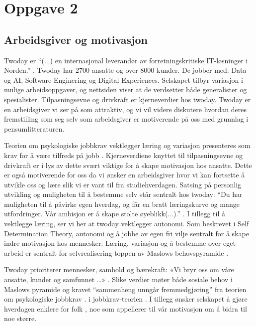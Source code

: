\section{Oppgave 2}
\subsection{Arbeidsgiver og motivasjon}
Twoday er \enquote{(...) en internasjonal leverandør av forretningskritiske IT-løsninger i Norden.}
\parencite{Twoday.no}. Twoday har 2700 ansatte og over 8000 kunder. De jobber med: Data og AI, Software Enginering og Digital Experiences. Selskapet tilbyr variasjon i mulige arbeidsoppgaver, og nettsiden viser at de
verdsetter både generalister og spesialister. Tilpasningsevne og drivkraft er kjerneverdier hos twoday. Twoday er
en arbeidsgiver vi ser på som attraktiv, og vi vil videre diskutere hvordan deres fremstilling som seg selv som 
arbeidsgiver er motiverende på oss med grunnlag i pensumlitteraturen. 

Teorien om psykologiske jobbkrav vektlegger læring og variasjon presenteres som krav for å være tilfreds på jobb \parencite[][s.120]{Teknologiledelse}. 
Kjerneverdiene knyttet til tilpasningsevne og drivkraft er i lys av dette svært viktige for å skape motivasjon hos ansatte. Dette er også motiverende for 
oss da vi ønsker en arbeidsgiver hvor vi kan fortsette å utvikle oss og lære slik vi er vant til fra studiehverdagen.
Satsing på personlig utvikling og muligheten til å bestemme selv står sentralt hos twoday: \enquote{Du har muligheten
til å påvirke egen hverdag, og får en bratt læringskurve og mange utfordringer. Vår ambisjon er å
skape stolte øyeblikk(...).} \parencite["Graduateprogrammet"]{Twoday.no}. I tillegg til å vektlegge læring, ser
vi her at twoday vektlegger autonomi. Som beskrevet i Self Determination Theory\parencite[][s.121]{Teknologiledelse},
autonomi og å jobbe av egen fri vilje sentralt for å skape indre motivasjon hos mennesker. Læring,
variasjon og å bestemme over eget arbeid er sentralt for selvrealisering-toppen av Maslows
behovspyramide \parencite[][s.116]{Teknologiledelse}.

Twoday prioriterer mennesker, samhold og bærekraft:  
«Vi bryr oss om våre ansatte, kunder og samfunnet …» \parencite["Om oss"]{Twoday.no}.  
Slike verdier møter både sosiale behov i Maslows pyramide og kravet “sammenheng unngår
fremmedgjøring” fra teorien om psykologiske jobbkrav \parencite[][s.120]{Teknologiledelse}. i jobbkrav-teorien \parencite[][s. 120]{Teknologiledelse}.  
I tillegg ønsker selskapet å gjøre hverdagen enklere for folk \parencite["Graduateprogrammet"]{Twoday.no}, noe som appellerer til vår motivasjon om å bidra til noe større.  




